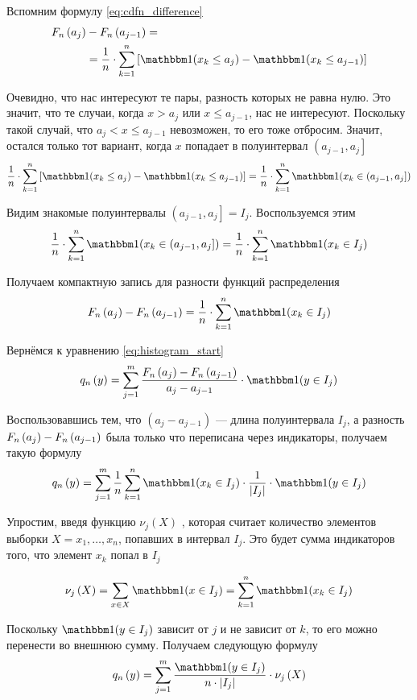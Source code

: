 Вспомним формулу \eqref{eq:cdfn_difference}
\begin{align*}
    \cdfn{a_j}&-\cdfn{a_{j-1}}=\\
    &=\frac{1}{n}\cdot \sum_{k=1}^n
    \left[\indicator{x_k\le a_j}-\indicator{x_k\le a_{j-1}}\right]
\end{align*}

Очевидно, что нас интересуют те пары, разность которых не равна нулю.
Это значит, что те случаи, когда $x>a_j$ или $x\le a_{j-1}$, нас не интересуют.
Поскольку такой случай, что $a_j<x\le a_{j-1}$ невозможен, то его тоже отбросим.
Значит, остался только тот вариант,
когда $x$ попадает в полуинтервал $\left(a_{j-1},a_j\right]$
$$\frac{1}{n}\cdot \sum_{k=1}^n
        \left[\indicator{x_k\le a_j}-\indicator{x_k\le a_{j-1}}\right]
    =\frac{1}{n}\cdot \sum_{k=1}^n \indicator{x_k\in \left(a_{j-1},a_j\right]}
$$

Видим знакомые полуинтервалы $\left(a_{j-1},a_j\right]=I_j$. Воспользуемся этим
$$\frac{1}{n}\cdot \sum_{k=1}^n \indicator{x_k\in \left(a_{j-1},a_j\right]}
=\frac{1}{n}\cdot \sum_{k=1}^n \indicator{x_k\in I_j}$$

Получаем компактную запись для разности функций распределения
\begin{equation}\label{eq:cdfn_difference_final}
\cdfn{a_j}-\cdfn{a_{j-1}}
=\frac{1}{n}\cdot \sum_{k=1}^n \indicator{x_k\in I_j}
\end{equation}


Вернёмся к уравнению \eqref{eq:histogram_start}
$$
q_n\left(y\right)
=\sum_{j=1}^m \frac{\cdfn{a_j}-\cdfn{a_{j-1}}}{a_j-a_{j-1}}
    \cdot\indicator{y\in I_j}
    $$

Воспользовавшись тем,
что $\left(a_j-a_{j-1}\right)$ --- длина полуинтервала $I_j$,
а разность $F_n\left(a_j\right)-F_n\left(a_{j-1}\right)$ была только что переписана
через индикаторы, получаем такую формулу
$$q_n\left(y\right)=\sum_{j=1}^m\frac{1}{n}\sum_{k=1}^n
\indicator{x_k\in I_j}\cdot\frac{1}{\left|I_j\right|}
\cdot\indicator{y \in I_j}$$

Упростим, введя функцию $\nu_j\left(X\right)$ \cite[стр.~68]{BorovkovMS},
которая считает количество элементов выборки $X=x_1, \dots, x_n$,
попавших в интервал $I_j$.
Это будет сумма индикаторов того, что элемент $x_k$ попал в $I_j$

$$\nu_j\left(X\right)
=\sum_{x\in X} \indicator{x\in I_j}
=\sum_{k=1}^n \indicator{x_k\in I_j}$$

Поскольку $\indicator{y\in I_j}$ зависит от $j$ и не зависит от $k$,
то его можно перенести во внешнюю сумму. Получаем следующую формулу
$$q_n\left(y\right)
=\sum_{j=1}^m \frac{\indicator{y\in I_j}}{n\cdot\left|I_j\right|}
    \cdot\nu_j\left(X\right)$$

